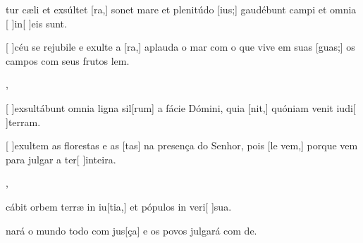 {  {\item {}tur cæli et exsúltet [ra,] sonet mare et plenitúdo [ius;] gaudébunt campi et omnia [ ]{in}[ ]{e}is sunt.~\Antiphona}%
    {\item {}[ ]{céu} se rejubile e exulte a [ra,] aplauda o mar com o que vive em suas [guas;] os campos com seus frutos lem.~\Antiphona},
  {\item {}[ ]{ex}sultábunt omnia ligna sil[rum] a fácie Dómini, quia [nit,] quóniam venit iudi[ ]{ter}ram.~\Antiphona}%
    {\item {}[ ]{e}xultem as florestas e as [tas] na presença do Senhor, pois [le vem,] porque vem para julgar a ter[ ]{in}{tei}ra.~\Antiphona},
  {\item {}cábit orbem terræ in iu[tia,] et pópulos in veri[ ]{su}a.~\Antiphona}%
    {\item {}nará o mundo todo com jus[ça] e os povos julgará com de.~\Antiphona}
}